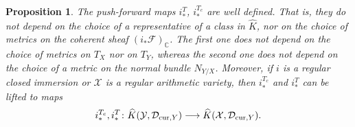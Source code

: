 \documentclass[10pt,twoside]{article}
\numberwithin{equation}{section}
\theoremstyle{plain}
\newtheorem{proposition}[equation]{Proposition}
\theoremstyle{definition}
\newcommand{\CC}{{\mathbb C}}
\newcommand{\D}{\text{{\rm cur}}}
\begin{document}
\begin{proposition}
  The push-forward maps $i^{T}_{\ast}$, $i^{T_{c}}_{\ast}$ are well
  defined. That is, they do 
  not depend on the choice of a representative  of a class in
  $\widehat K$, nor
  on the choice of metrics on the coherent sheaf
  $(i_{\ast}\mathcal{F})_{\CC}$. The first one does not depend on the
  choice of metrics on $T_{X}$ nor on $T_{Y}$, whereas the second one
  does  
  not depend on the choice of a metric on the normal bundle 
  $N_{Y/X}$. Moreover, if $i$ is a regular closed immersion or
  $\mathcal{X}$ is a regular arithmetic variety, then $i^{T_{c}}_{\ast}$
  and $i^{T}_{\ast}$
  can be lifted to maps
  \begin{displaymath}
    i^{T_{c}}_{\ast}, i^{T}_{\ast}\colon \widehat
    K(\mathcal{Y},\mathcal{D}_{\D,Y})\longrightarrow  
    \widehat K(\mathcal{X},\mathcal{D}_{\D,Y}).
  \end{displaymath}
\end{proposition}
\end{document}
